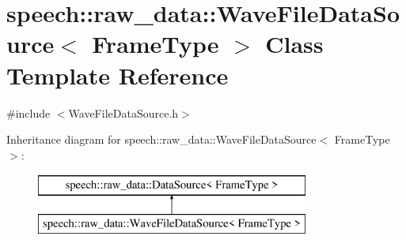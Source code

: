 \hypertarget{classspeech_1_1raw__data_1_1WaveFileDataSource}{\section{speech\+:\+:raw\+\_\+data\+:\+:Wave\+File\+Data\+Source$<$ Frame\+Type $>$ Class Template Reference}
\label{classspeech_1_1raw__data_1_1WaveFileDataSource}
}


{\ttfamily \#include $<$Wave\+File\+Data\+Source.\+h$>$}

Inheritance diagram for speech\+:\+:raw\+\_\+data\+:\+:Wave\+File\+Data\+Source$<$ Frame\+Type $>$\+:\begin{figure}[H]
\begin{center}
\leavevmode
\includegraphics[height=2.000000cm]{classspeech_1_1raw__data_1_1WaveFileDataSource}
\end{center}
\end{figure}
